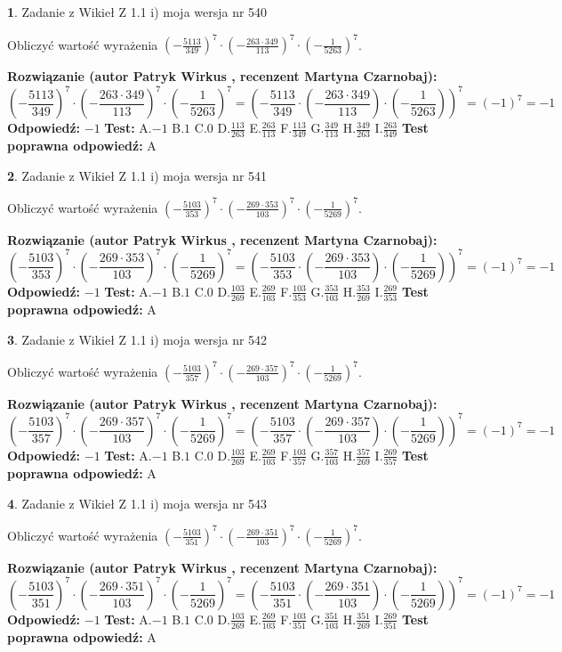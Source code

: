 \documentclass[12pt, a4paper]{article}
\theoremstyle{definition} %
\newtheorem{zad}{}
\newcommand{\zadStart}[1]{\begin{zad}#1\newline}
\newcommand{\zadStop}{\end{zad}}
\newcommand{\rozwStart}[2]{\noindent \textbf{Rozwiązanie (autor #1 , recenzent #2): }\newline}
\newcommand{\rozwStop}{\newline}
\newcommand{\odpStart}{\noindent \textbf{Odpowiedź:}\newline}
\newcommand{\odpStop}{\newline}
\newcommand{\testStart}{\noindent \textbf{Test:}\newline}
\newcommand{\testStop}{\newline}
\newcommand{\kluczStart}{\noindent \textbf{Test poprawna odpowiedź:}\newline}
\newcommand{\kluczStop}{\newline}
\begin{document}
\zadStart{Zadanie z Wikieł Z 1.1 i) moja wersja nr 540}

Obliczyć wartość wyrażenia $(-\frac{5113}{349})^{7} \cdot (-\frac{263 \cdot 349}{113})^{7} \cdot (-\frac{1}{5263})^{7}$.
\zadStop
\rozwStart{Patryk Wirkus}{Martyna Czarnobaj}
$$(-\frac{5113}{349})^{7} \cdot (-\frac{263 \cdot 349}{113})^{7} \cdot (-\frac{1}{5263})^{7} = (-\frac{5113}{349} \cdot (-\frac{263 \cdot 349}{113}) \cdot (-\frac{1}{5263}))^{7} = (-1)^{7} = -1$$
\rozwStop
\odpStart
$-1$
\odpStop
\testStart
A.$-1$ B.$1$ C.$0$ D.$\frac{113}{263}$ E.$\frac{263}{113}$
F.$\frac{113}{349}$ G.$\frac{349}{113}$
H.$\frac{349}{263}$
I.$\frac{263}{349}$
\testStop
\kluczStart
A
\kluczStop



\zadStart{Zadanie z Wikieł Z 1.1 i) moja wersja nr 541}

Obliczyć wartość wyrażenia $(-\frac{5103}{353})^{7} \cdot (-\frac{269 \cdot 353}{103})^{7} \cdot (-\frac{1}{5269})^{7}$.
\zadStop
\rozwStart{Patryk Wirkus}{Martyna Czarnobaj}
$$(-\frac{5103}{353})^{7} \cdot (-\frac{269 \cdot 353}{103})^{7} \cdot (-\frac{1}{5269})^{7} = (-\frac{5103}{353} \cdot (-\frac{269 \cdot 353}{103}) \cdot (-\frac{1}{5269}))^{7} = (-1)^{7} = -1$$
\rozwStop
\odpStart
$-1$
\odpStop
\testStart
A.$-1$ B.$1$ C.$0$ D.$\frac{103}{269}$ E.$\frac{269}{103}$
F.$\frac{103}{353}$ G.$\frac{353}{103}$
H.$\frac{353}{269}$
I.$\frac{269}{353}$
\testStop
\kluczStart
A
\kluczStop



\zadStart{Zadanie z Wikieł Z 1.1 i) moja wersja nr 542}

Obliczyć wartość wyrażenia $(-\frac{5103}{357})^{7} \cdot (-\frac{269 \cdot 357}{103})^{7} \cdot (-\frac{1}{5269})^{7}$.
\zadStop
\rozwStart{Patryk Wirkus}{Martyna Czarnobaj}
$$(-\frac{5103}{357})^{7} \cdot (-\frac{269 \cdot 357}{103})^{7} \cdot (-\frac{1}{5269})^{7} = (-\frac{5103}{357} \cdot (-\frac{269 \cdot 357}{103}) \cdot (-\frac{1}{5269}))^{7} = (-1)^{7} = -1$$
\rozwStop
\odpStart
$-1$
\odpStop
\testStart
A.$-1$ B.$1$ C.$0$ D.$\frac{103}{269}$ E.$\frac{269}{103}$
F.$\frac{103}{357}$ G.$\frac{357}{103}$
H.$\frac{357}{269}$
I.$\frac{269}{357}$
\testStop
\kluczStart
A
\kluczStop



\zadStart{Zadanie z Wikieł Z 1.1 i) moja wersja nr 543}

Obliczyć wartość wyrażenia $(-\frac{5103}{351})^{7} \cdot (-\frac{269 \cdot 351}{103})^{7} \cdot (-\frac{1}{5269})^{7}$.
\zadStop
\rozwStart{Patryk Wirkus}{Martyna Czarnobaj}
$$(-\frac{5103}{351})^{7} \cdot (-\frac{269 \cdot 351}{103})^{7} \cdot (-\frac{1}{5269})^{7} = (-\frac{5103}{351} \cdot (-\frac{269 \cdot 351}{103}) \cdot (-\frac{1}{5269}))^{7} = (-1)^{7} = -1$$
\rozwStop
\odpStart
$-1$
\odpStop
\testStart
A.$-1$ B.$1$ C.$0$ D.$\frac{103}{269}$ E.$\frac{269}{103}$
F.$\frac{103}{351}$ G.$\frac{351}{103}$
H.$\frac{351}{269}$
I.$\frac{269}{351}$
\testStop
\kluczStart
A
\kluczStop
\end{document}

